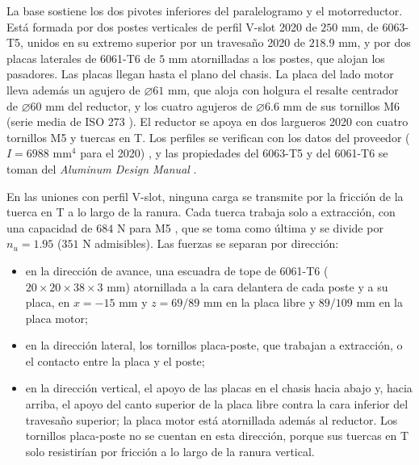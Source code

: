 \documentclass[../../General.tex]{subfiles}
\begin{document}
La base sostiene los dos pivotes inferiores del paralelogramo y el motorreductor. Está formada por dos postes verticales de perfil V-slot 2020 de $250\text{ mm}$, de 6063-T5, unidos en su extremo superior por un travesaño 2020 de $218.9\text{ mm}$, y por dos placas laterales de 6061-T6 de $5\text{ mm}$ atornilladas a los postes, que alojan los pasadores. Las placas llegan hasta el plano del chasis. La placa del lado motor lleva además un agujero de $\varnothing 61\text{ mm}$, que aloja con holgura el resalte centrador de $\varnothing 60\text{ mm}$ del reductor, y los cuatro agujeros de $\varnothing 6.6\text{ mm}$ de sus tornillos M6 (serie media de ISO 273 \citep{iso273}). El reductor se apoya en dos largueros 2020 con cuatro tornillos M5 y tuercas en T. Los perfiles se verifican con los datos del proveedor ($I = 6988\text{ mm}^4$ para el 2020) \citep{naylamp_2020}, y las propiedades del 6063-T5 y del 6061-T6 se toman del \textit{Aluminum Design Manual} \citep{aluminum2005manual}.

En las uniones con perfil V-slot, ninguna carga se transmite por la fricción de la tuerca en T a lo largo de la ranura. Cada tuerca trabaja solo a extracción, con una capacidad de $684\text{ N}$ para M5 \citep{ooznest_tnut}, que se toma como última y se divide por $n_u = 1.95$ ($351\text{ N}$ admisibles). Las fuerzas se separan por dirección:
\begin{itemize}
    \item en la dirección de avance, una escuadra de tope de 6061-T6 ($20 \times 20 \times 38 \times 3\text{ mm}$) atornillada a la cara delantera de cada poste y a su placa, en $x = -15\text{ mm}$ y $z = 69/89\text{ mm}$ en la placa libre y $89/109\text{ mm}$ en la placa motor;
    \item en la dirección lateral, los tornillos placa-poste, que trabajan a extracción, o el contacto entre la placa y el poste;
    \item en la dirección vertical, el apoyo de las placas en el chasis hacia abajo y, hacia arriba, el apoyo del canto superior de la placa libre contra la cara inferior del travesaño superior; la placa motor está atornillada además al reductor. Los tornillos placa-poste no se cuentan en esta dirección, porque sus tuercas en T solo resistirían por fricción a lo largo de la ranura vertical.
\end{itemize}
\end{document}
